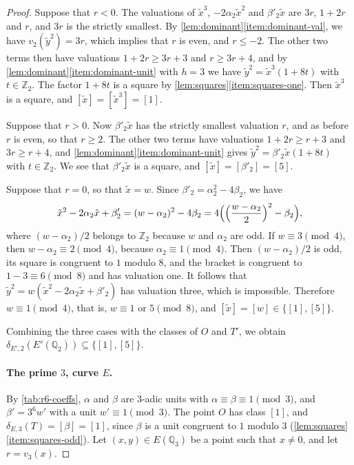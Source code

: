 \documentclass[12pt,oneside,openany]{book}
\theoremstyle{definition}
\theoremstyle{plain}
\numberwithin{equation}{chapter}
\theoremstyle{plain}
\theoremstyle{definition}
\theoremstyle{remark}
\newcommand{\Q}{\mathbb Q}
\newcommand{\Z}{\mathbb Z}
\newcommand{\sq}[1]{[#1]}
\begin{document}
\begin{proof}
Suppose that $r<0$. The valuations of $\tilde x^3$, $-2\alpha_2\tilde x^2$ and $\beta'_2\tilde x$ are $3r$, $1+2r$ and $r$, and $3r$ is the strictly smallest. By \cref{lem:dominant}\ref{item:dominant-val}, we have $v_2(\tilde y^2)=3r$, which implies that $r$ is even, and $r\le-2$. The other two terms then have valuations $1+2r\ge3r+3$ and $r\ge3r+4$, and by \cref{lem:dominant}\ref{item:dominant-unit} with $h=3$ we have $\tilde y^2=\tilde x^3(1+8t)$ with $t\in\Z_2$. The factor $1+8t$ is a square by \cref{lem:squares}\ref{item:squares-one}. Then $\tilde x^3$ is a square, and $\sq{\tilde x}=\sq{\tilde x^3}=\sq1$.

Suppose that $r>0$. Now $\beta'_2\tilde x$ has the strictly smallest valuation $r$, and as before $r$ is even, so that $r\ge2$. The other two terms have valuations $1+2r\ge r+3$ and $3r\ge r+4$, and \cref{lem:dominant}\ref{item:dominant-unit} gives $\tilde y^2=\beta'_2\tilde x(1+8t)$ with $t\in\Z_2$. We see that $\beta'_2\tilde x$ is a square, and $\sq{\tilde x}=\sq{\beta'_2}=\sq5$.

Suppose that $r=0$, so that $\tilde x=w$. Since $\beta'_2=\alpha_2^2-4\beta_2$, we have
\[
\tilde x^2-2\alpha_2\tilde x+\beta'_2=(w-\alpha_2)^2-4\beta_2=4\Bigl(\Bigl(\frac{w-\alpha_2}{2}\Bigr)^2-\beta_2\Bigr),
\]
where $(w-\alpha_2)/2$ belongs to $\Z_2$ because $w$ and $\alpha_2$ are odd. If $w\equiv3\pmod4$, then $w-\alpha_2\equiv2\pmod 4$, because $\alpha_2\equiv1\pmod4$. Then $(w-\alpha_2)/2$ is odd, its square is congruent to $1$ modulo $8$, and the bracket is congruent to $1-3\equiv6\pmod8$ and has valuation one. It follows that $\tilde y^2=w(\tilde x^2-2\alpha_2\tilde x+\beta'_2)$ has valuation three, which is impossible. Therefore $w\equiv1\pmod4$, that is, $w\equiv1$ or $5\pmod8$, and $\sq{\tilde x}=\sq w\in\{\sq1,\sq5\}$.

Combining the three cases with the classes of $O$ and $T'$, we obtain $\delta_{E',2}(E'(\Q_2))\subseteq\{\sq1,\sq5\}$.

\paragraph{The prime $3$, curve $E$.} By \cref{tab:r6-coeffs}, $\alpha$ and $\beta$ are $3$-adic units with $\alpha\equiv\beta\equiv1\pmod3$, and $\beta'=3^6w'$ with a unit $w'\equiv1\pmod3$. The point $O$ has class $\sq1$, and $\delta_{E,3}(T)=\sq\beta=\sq1$, since $\beta$ is a unit congruent to $1$ modulo $3$ (\cref{lem:squares}\ref{item:squares-odd}). Let $(x,y)\in E(\Q_3)$ be a point such that $x\ne0$, and let $r=v_3(x)$.


\end{proof}
\end{document}
